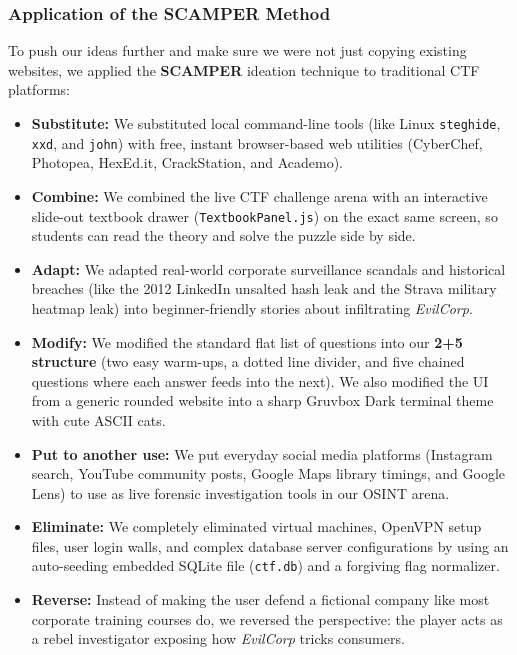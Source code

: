 \documentclass[11pt,a4paper]{article}
\begin{document}
\subsubsection{Application of the SCAMPER Method}
To push our ideas further and make sure we were not just copying existing websites, we applied the \textbf{SCAMPER} ideation technique to traditional CTF platforms:
\begin{itemize}
    \item \textbf{Substitute:} We substituted local command-line tools (like Linux \texttt{steghide}, \texttt{xxd}, and \texttt{john}) with free, instant browser-based web utilities (CyberChef, Photopea, HexEd.it, CrackStation, and Academo).
    \item \textbf{Combine:} We combined the live CTF challenge arena with an interactive slide-out textbook drawer (\texttt{TextbookPanel.js}) on the exact same screen, so students can read the theory and solve the puzzle side by side.
    \item \textbf{Adapt:} We adapted real-world corporate surveillance scandals and historical breaches (like the 2012 LinkedIn unsalted hash leak and the Strava military heatmap leak) into beginner-friendly stories about infiltrating \textit{EvilCorp}.
    \item \textbf{Modify:} We modified the standard flat list of questions into our \textbf{2+5 structure} (two easy warm-ups, a dotted line divider, and five chained questions where each answer feeds into the next). We also modified the UI from a generic rounded website into a sharp Gruvbox Dark terminal theme with cute ASCII cats.
    \item \textbf{Put to another use:} We put everyday social media platforms (Instagram search, YouTube community posts, Google Maps library timings, and Google Lens) to use as live forensic investigation tools in our OSINT arena.
    \item \textbf{Eliminate:} We completely eliminated virtual machines, OpenVPN setup files, user login walls, and complex database server configurations by using an auto-seeding embedded SQLite file (\texttt{ctf.db}) and a forgiving flag normalizer.
    \item \textbf{Reverse:} Instead of making the user defend a fictional company like most corporate training courses do, we reversed the perspective: the player acts as a rebel investigator exposing how \textit{EvilCorp} tricks consumers.
\end{itemize}

\clearpage
\end{document}
